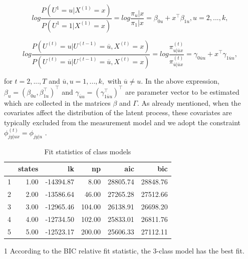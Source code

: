 \begin{equation}
log\frac{P(U^{1}=u|X^{(1)}=x)}{P(U^{1}=1|X^{(1)}=x)}=log\frac{\pi_{u}|x}{\pi_{1}|x}=\beta_{0u}+x^\top \beta_{1u}, u=2,...,k,
\end{equation}


\begin{equation}
log\frac{P(U^{(t)}=u|U^{(t-1)}=\overline{u},X^{(t)}=x)}{P(U^{(t)}=\overline{u}|U^{(t-1)}=\overline{u},X^{(t)}=x)} = log\frac{\pi^{(t)}_{u|\overline{u}x}}{\pi^{(t)}_{\overline{u}|\overline{u}x}}=\gamma_{0\overline{u}u}+x^{\top}\gamma_{1\overline{u}u},
\end{equation}

for \( t=2,...,T \) and \( \overline{u}, u = 1,...,k, \) with \( \overline{u} \neq u\). In the above expression, \( \beta_u = (\beta_{0u},\beta^\top_{1u})^\top\) and \(\gamma_{\overline{u}u}=(\gamma^\top_{1\overline{u}u})^\top \) are parameter vector to be estimated which are collected in the matrices \(\beta \) and \( \Gamma \). As already mentioned, when the covariates affect the distribution of the latent process, these covariates are typically excluded from the measurement model and we adopt the constraint \( \phi^{(t)}_{jy|ux}=\phi_{jy|u}\) \parencite{bartolucci_lmest_2017}. 





\begin{table}[H]
\centering
\begin{threeparttable}
\caption{\label{demo-table} Fit statistics of class models}
\begin{tabular}{rrrrrr}
  \hline
 & states & lk & np & aic & bic \\ 
  \hline
1 & 1.00 & -14394.87 & 8.00 & 28805.74 & 28848.76 \\ 
  2 & 2.00 & -13586.64 & 46.00 & 27265.28 & 27512.66 \\ 
  3 & 3.00 & -12965.46 & 104.00 & 26138.91 & 26698.20 \\ 
  4 & 4.00 & -12734.50 & 102.00 & 25833.01 & 26811.76 \\ 
  5 & 5.00 & -12523.17 & 200.00 & 25606.33 & 27112.11 \\ 
   \hline
\end{tabular}
\begin{tablenotes}
    \item[1] According to the BIC relative fit statistic, the 3-class model has the best fit.
  \end{tablenotes}
\end{threeparttable}
\end{table}

